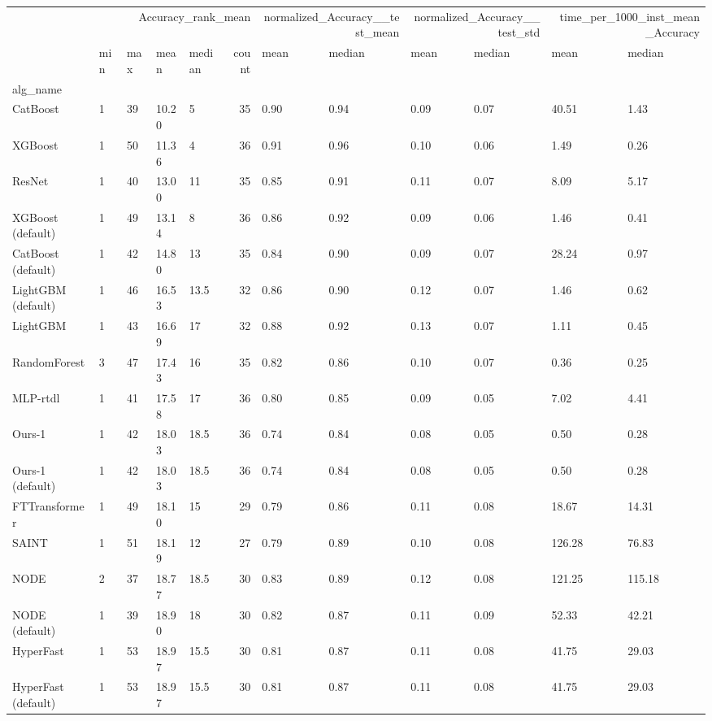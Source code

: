 \begin{tabular}{lllllrllllll}
\toprule
 & \multicolumn{5}{r}{Accuracy_rank_mean} & \multicolumn{2}{r}{normalized_Accuracy__test_mean} & \multicolumn{2}{r}{normalized_Accuracy__test_std} & \multicolumn{2}{r}{time_per_1000_inst_mean_Accuracy} \\
 & min & max & mean & median & count & mean & median & mean & median & mean & median \\
alg_name &  &  &  &  &  &  &  &  &  &  &  \\
\midrule
CatBoost & 1 & 39 & 10.20 & 5 & 35 & 0.90 & 0.94 & 0.09 & 0.07 & 40.51 & 1.43 \\
XGBoost & 1 & 50 & 11.36 & 4 & 36 & 0.91 & 0.96 & 0.10 & 0.06 & 1.49 & 0.26 \\
ResNet & 1 & 40 & 13.00 & 11 & 35 & 0.85 & 0.91 & 0.11 & 0.07 & 8.09 & 5.17 \\
XGBoost (default) & 1 & 49 & 13.14 & 8 & 36 & 0.86 & 0.92 & 0.09 & 0.06 & 1.46 & 0.41 \\
CatBoost (default) & 1 & 42 & 14.80 & 13 & 35 & 0.84 & 0.90 & 0.09 & 0.07 & 28.24 & 0.97 \\
LightGBM (default) & 1 & 46 & 16.53 & 13.5 & 32 & 0.86 & 0.90 & 0.12 & 0.07 & 1.46 & 0.62 \\
LightGBM & 1 & 43 & 16.69 & 17 & 32 & 0.88 & 0.92 & 0.13 & 0.07 & 1.11 & 0.45 \\
RandomForest & 3 & 47 & 17.43 & 16 & 35 & 0.82 & 0.86 & 0.10 & 0.07 & 0.36 & 0.25 \\
MLP-rtdl & 1 & 41 & 17.58 & 17 & 36 & 0.80 & 0.85 & 0.09 & 0.05 & 7.02 & 4.41 \\
Ours-1 & 1 & 42 & 18.03 & 18.5 & 36 & 0.74 & 0.84 & 0.08 & 0.05 & 0.50 & 0.28 \\
Ours-1 (default) & 1 & 42 & 18.03 & 18.5 & 36 & 0.74 & 0.84 & 0.08 & 0.05 & 0.50 & 0.28 \\
FTTransformer & 1 & 49 & 18.10 & 15 & 29 & 0.79 & 0.86 & 0.11 & 0.08 & 18.67 & 14.31 \\
SAINT & 1 & 51 & 18.19 & 12 & 27 & 0.79 & 0.89 & 0.10 & 0.08 & 126.28 & 76.83 \\
NODE & 2 & 37 & 18.77 & 18.5 & 30 & 0.83 & 0.89 & 0.12 & 0.08 & 121.25 & 115.18 \\
NODE (default) & 1 & 39 & 18.90 & 18 & 30 & 0.82 & 0.87 & 0.11 & 0.09 & 52.33 & 42.21 \\
HyperFast & 1 & 53 & 18.97 & 15.5 & 30 & 0.81 & 0.87 & 0.11 & 0.08 & 41.75 & 29.03 \\
HyperFast (default) & 1 & 53 & 18.97 & 15.5 & 30 & 0.81 & 0.87 & 0.11 & 0.08 & 41.75 & 29.03 \\

\end{tabular}

